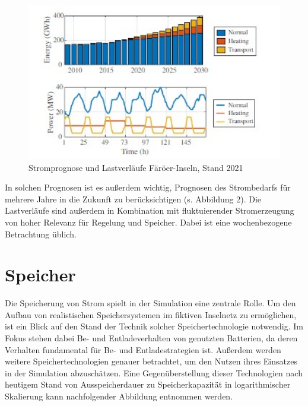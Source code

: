 \begin{figure}[h!]
    \centering
    \includegraphics[width=14cm]{Abbildungen/StandDerTechnikAbb2.jpg}
    \caption{Stromprognose und Lastverläufe Färöer-Inseln, Stand 2021}\label{fig:Stromprognose_und_Lastverläufe}
\end{figure}

In solchen Prognosen ist es außerdem wichtig, Prognosen des Strombedarfs für mehrere Jahre in die Zukunft zu berücksichtigen (s. Abbildung 2). 
Die Lastverläufe sind außerdem in Kombination mit fluktuierender Stromerzeugung von hoher Relevanz für Regelung und Speicher. 
Dabei ist eine wochenbezogene Betrachtung üblich.

\section{Speicher}

Die Speicherung von Strom spielt in der Simulation eine zentrale Rolle. 
Um den Aufbau von realistischen Speichersystemen im fiktiven Inselnetz zu ermöglichen, 
ist ein Blick auf den Stand der Technik solcher Speichertechnologie notwendig. 
Im Fokus stehen dabei Be- und Entladeverhalten von genutzten Batterien, da deren Verhalten fundamental für Be- und Entladestrategien ist. 
Außerdem werden weitere Speichertechnologien genauer betrachtet, um den Nutzen ihres Einsatzes in der Simulation abzuschätzen. 
Eine Gegenüberstellung dieser Technologien nach heutigem Stand von Ausspeicherdauer zu Speicherkapazität in 
logarithmischer Skalierung kann nachfolgender Abbildung entnommen werden.

